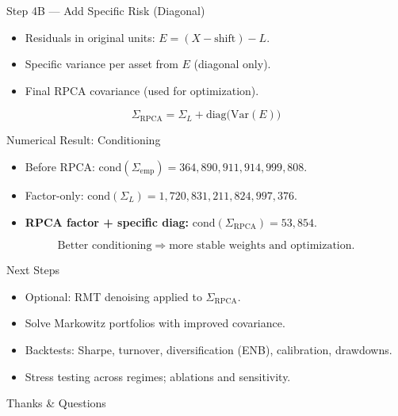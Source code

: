 \documentclass[aspectratio=169]{beamer}
\begin{document}
	\begin{frame}{Step 4B — Add Specific Risk (Diagonal)}
		\small
		\begin{itemize}
			\item Residuals in original units: $E = (X - \mathrm{shift}) - L$.
			\item Specific variance per asset from $E$ (diagonal only).
			\item Final RPCA covariance (used for optimization).
		\end{itemize}
		\begin{equation*}
			\Sigma_{\mathrm{RPCA}} = \Sigma_{L} + \mathrm{diag}\!\big(\mathrm{Var}(E)\big)
		\end{equation*}
	\end{frame}
	
	\begin{frame}{Numerical Result: Conditioning}
		\small
		\begin{itemize}
			\item Before RPCA: $\mathrm{cond}(\Sigma_{\text{emp}}) = 364{,}890{,}911{,}914{,}999{,}808$.
			\item Factor-only: $\mathrm{cond}(\Sigma_{L}) = 1{,}720{,}831{,}211{,}824{,}997{,}376$.
			\item \textbf{RPCA factor + specific diag:} $\mathrm{cond}(\Sigma_{\mathrm{RPCA}}) = 53{,}854$.
		\end{itemize}
		\begin{equation*}
			\text{Better conditioning} \;\Rightarrow\; \text{more stable weights and optimization.}
		\end{equation*}
	\end{frame}
	
	\begin{frame}{Next Steps}
		\small
		\begin{itemize}
			\item Optional: RMT denoising applied to $\Sigma_{\mathrm{RPCA}}$.
			\item Solve Markowitz portfolios with improved covariance.
			\item Backtests: Sharpe, turnover, diversification (ENB), calibration, drawdowns.
			\item Stress testing across regimes; ablations and sensitivity.
		\end{itemize}
	\end{frame}
	
	\begin{frame}{Thanks \& Questions}
	\end{frame}
	
\end{document}
